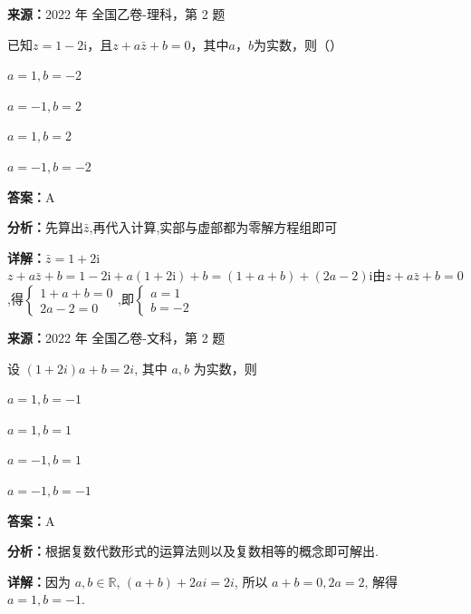 \begin{question}[points=5]
\textbf{来源：}2022 年 全国乙卷-理科，第 2 题\par
已知$z = 1 - 2\mathrm{i}$，且$z + a\bar{z} + b = 0$，其中$a$，$b$为实数，则（\qquad）
\begin{choices}
  \item $a = 1, b = -2$
  \item $a = -1, b = 2$
  \item $a = 1, b = 2$
  \item $a = -1, b = -2$
\end{choices}
\begin{solution}
\textbf{答案：}A

\textbf{分析：}先算出$\bar{z}$,再代入计算,实部与虚部都为零解方程组即可

\textbf{详解：}$\bar{z} = 1 + 2\mathrm{i}$\\$z + a\bar{z} + b = 1 - 2\mathrm{i} + a(1 + 2\mathrm{i}) + b = (1 + a + b) + (2a - 2)\mathrm{i}$由$z + a\bar{z} + b = 0$,得$\begin{cases} 1 + a + b = 0 \\ 2a - 2 = 0 \end{cases}$,即$\begin{cases} a = 1 \\ b = -2 \end{cases}$
\end{solution}
\end{question}

\begin{question}[points=5]
\textbf{来源：}2022 年 全国乙卷-文科，第 2 题\par
设 $(1+2i)a + b = 2i$, 其中 $a, b$ 为实数，则
\begin{choices}
  \item $a=1, b=-1$
  \item $a=1, b=1$
  \item $a=-1, b=1$
  \item $a=-1, b=-1$
\end{choices}
\begin{solution}
\textbf{答案：}A

\textbf{分析：}根据复数代数形式的运算法则以及复数相等的概念即可解出.

\textbf{详解：}因为 $a,b\in\mathbb{R}$, $(a+b)+2ai = 2i$, 所以 $a+b=0, 2a=2$, 解得 $a=1, b=-1$.
\end{solution}
\end{question}

